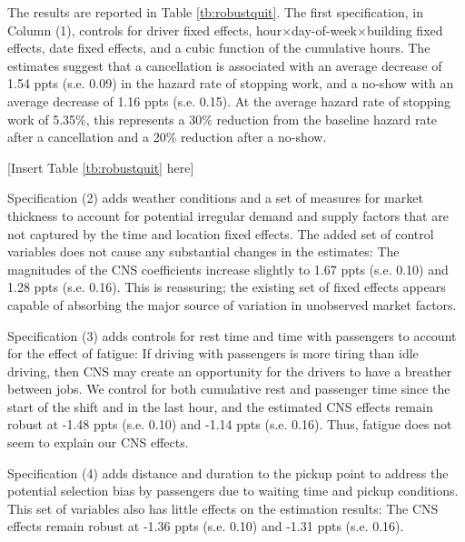 \documentclass[reviewmode,AEJ]{AEA}
\begin{document}
The results %
are reported in Table \ref{tb:robustquit}. 
The first specification, in Column (1), controls for driver fixed effects, hour\(\times\)day-of-week\(\times\)building fixed effects, date fixed effects, and a cubic function of the cumulative hours. The estimates %
suggest that a cancellation is associated with an average decrease of 1.54 ppts (s.e. 0.09) in the hazard rate of stopping work, and a no-show with an average decrease
of 1.16 ppts (s.e. 0.15). At the average hazard rate of stopping work of 5.35\%, this represents a 30\% reduction from the baseline hazard rate after a cancellation and a 20\% reduction after a no-show.

\begin{center}
	[Insert Table \ref{tb:robustquit} here]
\end{center}

Specification (2) adds weather conditions and a set of measures for market thickness to account for potential irregular demand and supply factors that are not captured by the time and location fixed effects. The added set of control variables does not cause any substantial changes in the estimates: The magnitudes of the CNS coefficients increase slightly to 1.67 ppts (s.e. 0.10) and 1.28 ppts (s.e. 0.16). This is reassuring; the existing set of fixed effects appears capable of absorbing the major source of variation in unobserved market factors.

Specification (3) adds controls for rest time and time with passengers %
 to account for the effect of fatigue: If driving with passengers %
is more tiring than idle driving, then CNS may create an opportunity for the drivers to have a breather between jobs. We control for both cumulative rest and passenger time since the start of the shift and in the last hour, and the estimated CNS effects remain robust at -1.48 ppts (s.e. 0.10) and -1.14 ppts (s.e. 0.16). Thus, fatigue does not seem to explain our CNS effects. %

Specification (4) adds distance and duration to the pickup point to address the potential selection bias by passengers due to waiting time and pickup conditions. This set of variables also has little effects on the estimation results: The CNS effects remain robust at -1.36 ppts (s.e. 0.10) and -1.31 ppts (s.e. 0.16).
\end{document}
